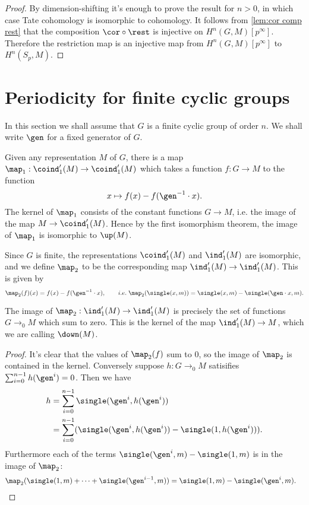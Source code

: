 \begin{proof}
	By dimension-shifting it's enough to prove the result for $n > 0$, in which case
	Tate cohomology is isomorphic to cohomology.
	It follows from \ref{lem:cor comp rest} that the
	composition $\cor \circ \rest$ is injective on $H^n(G,M)[p^\infty]$.
	Therefore the restriction map is an injective map from $H^n(G,M)[p^\infty]$
	to $H^n(S_p,M)$.
\end{proof}






\section{Periodicity for finite cyclic groups}

In this section we shall assume that $G$ is a finite cyclic group of order $n$.
We shall write $\gen$ for a fixed generator of $G$.

Given any representation $M$ of $G$, there is a map
$\map_1 : \coind_1'(M) \to \coind_1'(M)$ which takes a function $f : G \to M$ to the function
\[
	x \mapsto f(x) - f(\gen^{-1}\cdot x).
\]
The kernel of $\map_1$ consists of the constant functions $G \to M$, i.e. the image of the
map $M \to \coind_1'(M)$.
Hence by the first isomorphism theorem, the image of $\map_1$ is isomorphic to $\up(M)$.

Since $G$ is finite, the representations $\coind_1'(M)$ and $\ind_1'(M)$
are isomorphic, and we define $\map_2$ to be the corresponding map $\ind_1'(M) \to \ind_1'(M)$.
This is given by
\[
	\map_2(f) (x) = f(x) - f(\gen^{-1} \cdot x), \qquad i.e.\;
	\map_2(\single(x,m)) = \single(x,m) - \single(\gen \cdot x, m).
\]
\begin{lemma} \label{lem:map2 image}
	The image of $\map_2 : \ind_1'(M) \to \ind_1'(M)$ is precisely the set of functions $G \to_0 M$
	which sum to zero. This is the kernel of the map $\ind_1'(M) \to M$,
	which we are calling $\down(M)$.
\end{lemma}

\begin{proof}
	It's clear that the values of $\map_2(f)$ sum to $0$, so the image of $\map_2$ is contained in
	the kernel.
	Conversely suppose $h : G \to_0 M$ satisifies $\sum_{i=0}^{n-1} h(\gen^i) = 0$.
	Then we have
	\begin{align*}
		h
		& = \sum_{i=0}^{n-1} \single(\gen^i, h(\gen^i))\\
		& = \sum_{i=0}^{n-1} (\single(\gen^i, h(\gen^i)) - \single(1, h(\gen^i))).
	\end{align*}
	Furthermore each of the terms $\single(\gen^i, m) - \single(1, m)$ is in the
	image of $\map_2$:
	\begin{align*}
		\map_2 (\single(1,m) + \cdots + \single(\gen^{i-1},m))
		&=\single(1,m) - \single(\gen^i,m).
	\end{align*}
\end{proof}

